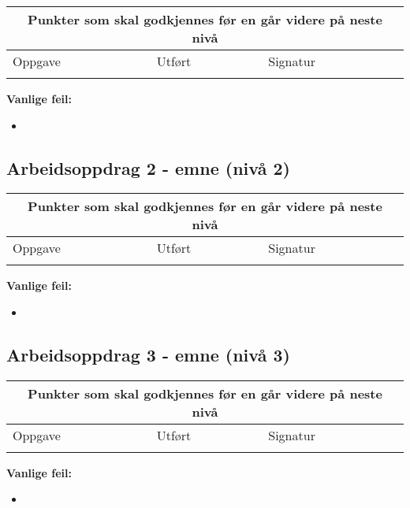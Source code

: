\begin{center} \begin{tabular}{ | m{8cm} | m{1cm}| m{2cm} | } 
\hline
\multicolumn{3}{|c|}{Punkter som skal godkjennes før en går videre på neste nivå} \\
	\hline
	Oppgave	& Utført & Signatur \\ 
	\hline
& & \\ 
	\hline
\end{tabular}
\end{center}

\textbf{Vanlige feil:}
\begin{itemize}[noitemsep]
	\item 
\end{itemize}
\newpage
\subsection*{Arbeidsoppdrag 2 - emne (nivå 2)}

\begin{center}
\begin{tabular}{ | m{8cm} | m{1cm}| m{2cm} | } 
\hline
\multicolumn{3}{|c|}{Punkter som skal godkjennes før en går videre på neste nivå} \\
	\hline
	Oppgave	& Utført & Signatur \\ 
	\hline
& & \\ 
	\hline
\end{tabular}
\end{center}
\textbf{Vanlige feil:}
\begin{itemize}[noitemsep]
	\item 
\end{itemize}
\newpage
\subsection*{Arbeidsoppdrag 3 - emne (nivå 3)}

\begin{center}
\begin{tabular}{ | m{8cm} | m{1cm}| m{2cm} | } 
\hline
\multicolumn{3}{|c|}{Punkter som skal godkjennes før en går videre på neste nivå} \\
	\hline
	Oppgave	& Utført & Signatur \\ 
	\hline
& & \\ 
	\hline
\end{tabular}
\end{center}
\textbf{Vanlige feil:}
\begin{itemize}[noitemsep]
	\item 
\end{itemize}
\newpage


